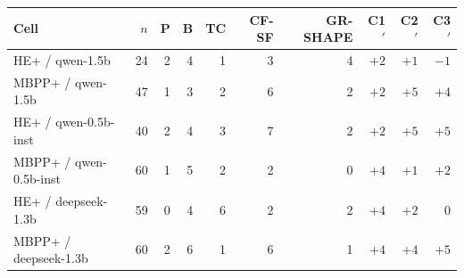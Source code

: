 \begin{tabular}{lrrrrrrrrr}
\toprule
Cell & $n$ & P & B & TC & CF-SF & GR-SHAPE & C1$'$ & C2$'$ & C3$'$ \\
\midrule
HE+ / qwen-1.5b & 24 & 2 & 4 & 1 & 3 & 4 & $+2$ & $+1$ & $-1$ \\
MBPP+ / qwen-1.5b & 47 & 1 & 3 & 2 & 6 & 2 & $+2$ & $+5$ & $+4$ \\
HE+ / qwen-0.5b-inst & 40 & 2 & 4 & 3 & 7 & 2 & $+2$ & $+5$ & $+5$ \\
MBPP+ / qwen-0.5b-inst & 60 & 1 & 5 & 2 & 2 & 0 & $+4$ & $+1$ & $+2$ \\
HE+ / deepseek-1.3b & 59 & 0 & 4 & 6 & 2 & 2 & $+4$ & $+2$ & $0$ \\
MBPP+ / deepseek-1.3b & 60 & 2 & 6 & 1 & 6 & 1 & $+4$ & $+4$ & $+5$ \\
\bottomrule
\end{tabular}
